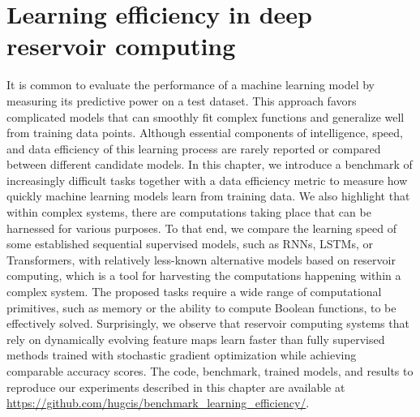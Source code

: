 \chapter{Learning efficiency in deep reservoir computing}
\label{cha:learn-effic-compl}

It is common to evaluate the performance of a machine learning model by
measuring its predictive power on a test dataset. This approach favors
complicated models that can smoothly fit complex functions and generalize well
from training data points. Although essential components of intelligence, speed, 
and data efficiency of this learning process are rarely reported or compared
between different candidate models. In this chapter, we introduce a benchmark 
of increasingly difficult tasks together with a data efficiency metric to measure 
how quickly machine learning models learn from training data. We also highlight 
that within complex systems, there are computations taking place that can be 
harnessed for various purposes. To that end, we compare the learning speed of 
some established sequential supervised models, such as RNNs, LSTMs, or Transformers, 
with relatively less-known alternative models based on reservoir computing, which 
is a tool for harvesting the computations happening within a complex system.
 The proposed tasks require a wide range of computational
primitives, such as memory or the ability to compute Boolean functions, to be
effectively solved. Surprisingly, we observe that reservoir computing systems
that rely on dynamically evolving feature maps learn faster than fully
supervised methods trained with stochastic gradient optimization while achieving
comparable accuracy scores. The code, benchmark, trained models, and results to
reproduce our experiments described in this chapter are available at
{\small\url{https://github.com/hugcis/benchmark_learning_efficiency/}}.


